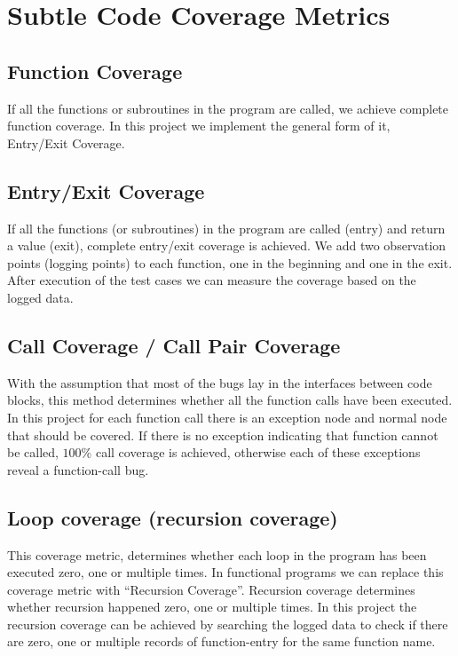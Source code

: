 \documentclass[12pt,a4paper]{report}
\begin{document}
\section{Subtle Code Coverage Metrics}

\subsection{Function Coverage}
If all the functions or subroutines in the program are called, we achieve complete function coverage.
In this project we implement the general form of it, Entry/Exit Coverage.

\subsection{Entry/Exit Coverage}
If all the functions (or subroutines) in the program are called (entry) and return a value (exit), complete entry/exit coverage is achieved.
We add two observation points (logging points) to each function, one in the beginning and one in the exit. After execution of the test cases we can measure the coverage based on the logged data. 

\subsection{Call Coverage / Call Pair Coverage}
With the assumption that most of the bugs lay in the interfaces between code blocks, this method determines whether all the function calls have been executed.
In this project for each function call there is an exception node and normal node that should be covered. If there is no exception indicating that function cannot be called, $100\%$ call coverage is achieved, otherwise each of these exceptions reveal a function-call bug.

\subsection{Loop coverage (recursion coverage)}
This coverage metric, determines whether each loop in the program has been executed zero, one or multiple times. In functional programs we can replace this coverage metric with ``Recursion Coverage''. Recursion coverage determines whether recursion happened zero, one or multiple times. In this project the recursion coverage can be achieved by searching the logged data to check if there are zero, one or multiple records of function-entry for the same function name.
\end{document}

